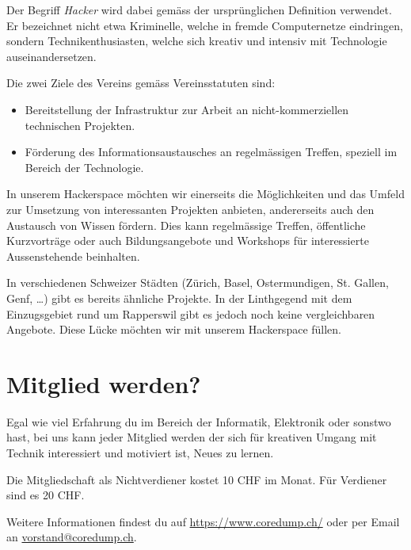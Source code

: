 \documentclass[10pt,a4paper,parskip,fleqn]{scrartcl}
\begin{document}
Der Begriff \textit{Hacker} wird dabei gemäss der ursprünglichen Definition
verwendet. Er bezeichnet nicht etwa Kriminelle, welche in fremde Computernetze
eindringen, sondern Technikenthusiasten, welche sich kreativ und intensiv mit
Technologie auseinandersetzen.

Die zwei Ziele des Vereins gemäss Vereinsstatuten sind:

\begin{itemize}
		\item Bereitstellung der Infrastruktur zur Arbeit an nicht-kommerziellen
			technischen Projekten.
		\item Förderung des Informationsaustausches an regelmässigen Treffen,
			speziell im Bereich der Technologie.
\end{itemize}

In unserem Hackerspace möchten wir einerseits die Möglichkeiten und das Umfeld
zur Umsetzung von interessanten Projekten anbieten, andererseits auch den
Austausch von Wissen fördern. Dies kann regelmässige Treffen, öffentliche
Kurzvorträge oder auch Bildungsangebote und Workshops für interessierte
Aussenstehende beinhalten.

In verschiedenen Schweizer Städten (Zürich, Basel, Ostermundigen, St.  Gallen,
Genf, \ldots) gibt es bereits ähnliche Projekte. In der Linthgegend mit dem
Einzugsgebiet rund um Rapperswil gibt es jedoch noch keine vergleichbaren
Angebote. Diese Lücke möchten wir mit unserem Hackerspace füllen.


% 
% 

\section{Mitglied werden?}

Egal wie viel Erfahrung du im Bereich der Informatik, Elektronik oder sonstwo
hast, bei uns kann jeder Mitglied werden der sich für kreativen Umgang mit
Technik interessiert und motiviert ist, Neues zu lernen.

Die Mitgliedschaft als Nichtverdiener kostet 10 CHF im Monat. Für Verdiener sind
es 20 CHF.

Weitere Informationen findest du auf \url{https://www.coredump.ch/} oder per
Email an \url{vorstand@coredump.ch}.
\end{document}

